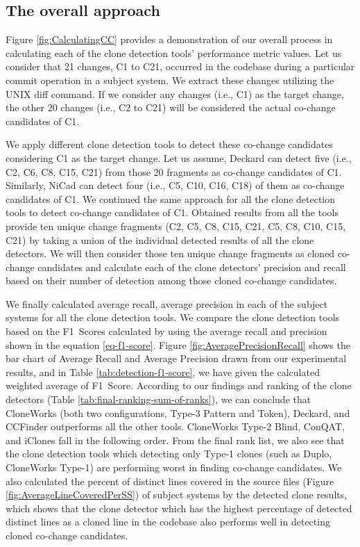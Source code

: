 \documentclass[review]{elsarticle}
\begin{document}
\subsection{The overall approach} 

Figure \ref{fig:CalculatingCC} provides a demonstration of our overall process in calculating each of the clone detection tools' performance metric values. Let us consider that 21 changes, C1 to C21, occurred in the codebase during a particular commit operation in a subject system. We extract these changes utilizing the UNIX diff command. If we consider any changes (i.e., C1) as the target change, the other 20 changes (i.e., C2 to C21) will be considered the actual co-change candidates of C1.  


We apply different clone detection tools to detect these co-change candidates considering C1 as the target change. Let us assume, Deckard can detect five (i.e., C2, C6, C8, C15, C21) from those 20 fragments as co-change candidates of C1. Similarly, NiCad can detect four (i.e., C5, C10, C16, C18) of them as co-change candidates of C1. We continued the same approach for all the clone detection tools to detect co-change candidates of C1. Obtained results from all the tools provide ten unique change fragments (C2, C5, C8, C15, C21, C5, C8, C10, C15, C21) by taking a union of the individual detected results of all the clone detectors. We will then consider those ten unique change fragments as cloned co-change candidates and calculate each of the clone detectors' precision and recall based on their number of detection among those cloned co-change candidates. 

We finally calculated average recall, average precision in each of the subject systems for all the clone detection tools. We compare the clone detection tools based on the F1~Scores calculated by using the average recall and precision shown in the equation \ref{eq-f1-score}. Figure \ref{fig:AveragePrecisionRecall} shows the bar chart of Average Recall and Average Precision drawn from our experimental results, and in Table \ref{tab:detection-f1-score}, we have given the calculated weighted average of F1~Score. According to our findings and ranking of the clone detectors (Table \ref{tab:final-ranking-sum-of-ranks}), we can conclude that CloneWorks (both two configurations, Type-3 Pattern and Token), Deckard, and CCFinder outperforms all the other tools. CloneWorks Type-2 Blind, ConQAT, and iClones fall in the following order. From the final rank list, we also see that the clone detection tools which detecting only Type-1 clones (such as Duplo, CloneWorks Type-1) are performing worst in finding co-change candidates.  We also calculated the percent of distinct lines covered in the source files (Figure \ref{fig:AverageLineCoveredPerSS}) of subject systems by the detected clone results, which shows that the clone detector which has the highest percentage of detected distinct lines as a cloned line in the codebase also performs well in detecting cloned co-change candidates.
\end{document}
